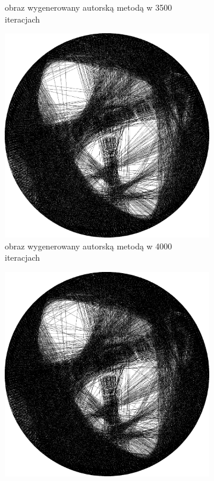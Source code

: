 \begin{figure}[H]
\begin{subfigure}{0.24\textwidth}
        \caption{obraz wygenerowany autorską metodą w 3500 iteracjach}
        \label{comp-comp-magdalene-i}
    \end{subfigure}
    \begin{subfigure}{0.24\textwidth}
        \centering
        \includegraphics[width = \textwidth]{img/6-comp/magdalene_e_i4000_c20_inv0_bg1_obj2_ed1.png}
        \caption{obraz wygenerowany autorską metodą w 4000 iteracjach}
        \label{comp-comp-magdalene-j}
    \end{subfigure}
    \begin{subfigure}{0.24\textwidth}
        \centering
        \includegraphics[width = \textwidth]{img/6-comp/magdalene_e_i4500_c20_inv0_bg1_obj2_ed1.png}

\end{subfigure}
\end{figure}
